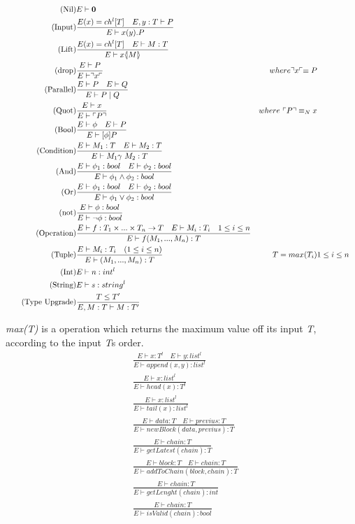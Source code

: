 \begin{align}
\tag{Nil} &E \vdash \mathbf{0}\\
\tag{Input} &\frac{E(x) = ch^l[T]\quad E,y:T\vdash P}{E \vdash x(y).P}\\
\tag{Lift} &\frac{E(x) = ch^l[T] \quad E \vdash M:T}{E\vdash x \langle \! | M | \! \rangle}\\
\tag{drop} &\frac{E \vdash P}{E\vdash \urcorner x \ulcorner}& where \urcorner x \ulcorner \equiv P\\
\tag{Parallel} &\frac{E\vdash P \quad E \vdash Q}{E \vdash P \mid Q}\\
\tag{Quot} &\frac{E \vdash x}{E\vdash \ulcorner P \urcorner}& where\ \ulcorner P \urcorner \equiv_N x\\
\tag{Bool} &\frac{E\vdash \phi \quad E\vdash P}{E \vdash [\phi] P}\\
\tag{Condition} &\frac{E\vdash M_1:T \quad E\vdash M_2:T}{E\vdash M_1 \gamma\ M_2:T}\\
\tag{And} &\frac{E\vdash \phi _1:bool \quad E\vdash \phi _2:bool}{E\vdash \phi _1 \land \phi _2:bool}\\
\tag{Or} &\frac{E\vdash \phi _1:bool \quad E\vdash \phi _2:bool}{E\vdash \phi _1 \lor \phi _2:bool}\\
\tag{not} &\frac{E\vdash \phi :bool }{E\vdash \neg \phi :bool}\\
\tag{Operation} &\frac{E\vdash f:T_1\times ... \times T_n\rightarrow T\quad E\vdash M_i:T_i\quad 1\leq i \leq n}{E\vdash f(M_1,...,M_n):T}\\
\tag{Tuple} &\frac{E\vdash M_i:T_i \quad (1\leq i\leq n)}{E\vdash (M_1,...,M_n):T}&T = max(T_i)& 1\leq i\leq n\\
\tag{Int} &E\vdash n: int^l\\
\tag{String} &E\vdash s:string^l\\
\tag{Type Upgrade} &\frac{T\leq T'}{E, M:T\vdash M:T'}
\end{align}


\textit{max(T)} is a operation which returns the maximum value off its input \textit{T}, according to the input \textit{T}s order.
\begin{align}
\tag{Append} &\frac{E \vdash x:T^l \quad E \vdash y:list^l}{E \vdash append(x,y):list^l}\\
\tag{Head} &\frac{E \vdash x:list^l}{E \vdash head(x):T^l}\\
\tag{Tail} &\frac{E \vdash x:list^l}{E \vdash tail(x):list^l}\\
\tag{newBlock}& \frac{E \vdash data:T \quad E \vdash previus : T}{E \vdash newBlock(data, previus) :T}\\
\tag{getLatest}& \frac{E \vdash chain :T}{E \vdash getLatest(chain):T}\\
\tag{addToChain}& \frac{E \vdash block:T \quad E \vdash chain:T}{E \vdash addToChain(block, chain):T}\\
\tag{getLenght}& \frac{E \vdash chain:T}{E \vdash getLenght(chain):int}\\
\tag{isValid}& \frac{E \vdash chain:T}{E \vdash isValid(chain):bool}
\end{align}


